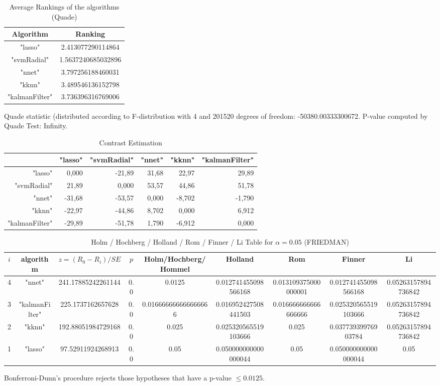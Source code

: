 \documentclass[a4paper,10pt]{article}
\begin{document}
\begin{landscape}
\newpage

\begin{table}[!htp]
\centering
\caption{Average Rankings of the algorithms (Quade)
}\begin{tabular}{c|c}
Algorithm&Ranking\\
\hline
"lasso"&2.413077290114864\\
"svmRadial"&1.5637240685032896\\
"nnet"&3.797256188460031\\
"kknn"&3.489546136152798\\
"kalmanFilter"&3.736396316769006\\
\end{tabular}
\end{table}
Quade statistic (distributed according to F-distribution with 4 and 201520 degrees of freedom: -50380.00333300672. 
P-value computed by Quade Test: Infinity.\newline


\newpage

\begin{table}[!htp]
\centering\tiny
\caption{Contrast Estimation}
\begin{tabular}{
|r|r|r|r|r|r|}
\hline
 &"lasso"&"svmRadial"&"nnet"&"kknn"&"kalmanFilter"\\
\hline
"lasso"&0,000&-21,89&31,68&22,97&29,89\\
\hline
"svmRadial"&21,89&0,000&53,57&44,86&51,78\\
\hline
"nnet"&-31,68&-53,57&0,000&-8,702&-1,790\\
\hline
"kknn"&-22,97&-44,86&8,702&0,000&6,912\\
\hline
"kalmanFilter"&-29,89&-51,78&1,790&-6,912&0,000\\
\hline

\end{tabular}
\end{table}

\newpage

\begin{table}[!htp]
\centering\scriptsize
\caption{Holm / Hochberg / Holland / Rom / Finner / Li Table for $\alpha=0.05$ (FRIEDMAN)}
\begin{tabular}{ccccccccc}
$i$&algorithm&$z=(R_0 - R_i)/SE$&$p$&Holm/Hochberg/Hommel&Holland&Rom&Finner&Li\\
\hline
4&"nnet"&241.17885242261144&0.0&0.0125&0.012741455098566168&0.013109375000000001&0.012741455098566168&0.05263157894736842\\
3&"kalmanFilter"&225.1737162657628&0.0&0.016666666666666666&0.016952427508441503&0.016666666666666666&0.025320565519103666&0.05263157894736842\\
2&"kknn"&192.88051984729168&0.0&0.025&0.025320565519103666&0.025&0.03773939976903784&0.05263157894736842\\
1&"lasso"&97.52911924268913&0.0&0.05&0.050000000000000044&0.05&0.050000000000000044&0.05\\
\hline
\end{tabular}
\end{table}
Bonferroni-Dunn's procedure rejects those hypotheses that have a p-value $\le0.0125$.



\end{landscape}
\end{document}
